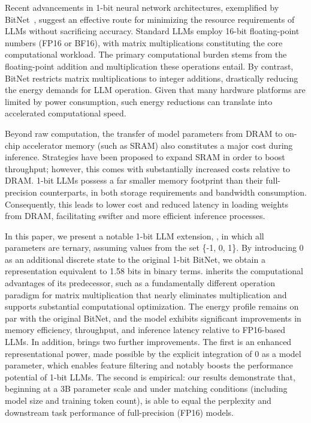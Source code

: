Recent advancements in 1-bit neural network architectures, exemplified by BitNet~\cite{bitnet}, suggest an effective route for minimizing the resource requirements of LLMs without sacrificing accuracy. Standard LLMs employ 16-bit floating-point numbers (FP16 or BF16), with matrix multiplications constituting the core computational workload. The primary computational burden stems from the floating-point addition and multiplication these operations entail. By contrast, BitNet restricts matrix multiplications to integer additions, drastically reducing the energy demands for LLM operation. Given that many hardware platforms are limited by power consumption, such energy reductions can translate into accelerated computational speed.

Beyond raw computation, the transfer of model parameters from DRAM to on-chip accelerator memory (such as SRAM) also constitutes a major cost during inference. Strategies have been proposed to expand SRAM in order to boost throughput; however, this comes with substantially increased costs relative to DRAM. 1-bit LLMs possess a far smaller memory footprint than their full-precision counterparts, in both storage requirements and bandwidth consumption. Consequently, this leads to lower cost and reduced latency in loading weights from DRAM, facilitating swifter and more efficient inference processes.

In this paper, we present a notable 1-bit LLM extension, \textbf{}, in which all parameters are ternary, assuming values from the set \{-1, 0, 1\}. By introducing 0 as an additional discrete state to the original 1-bit BitNet, we obtain a representation equivalent to 1.58 bits in binary terms.  inherits the computational advantages of its predecessor, such as a fundamentally different operation paradigm for matrix multiplication that nearly eliminates multiplication and supports substantial computational optimization. The energy profile remains on par with the original BitNet, and the model exhibits significant improvements in memory efficiency, throughput, and inference latency relative to FP16-based LLMs. In addition,  brings two further improvements. The first is an enhanced representational power, made possible by the explicit integration of 0 as a model parameter, which enables feature filtering and notably boosts the performance potential of 1-bit LLMs. The second is empirical: our results demonstrate that, beginning at a 3B parameter scale and under matching conditions (including model size and training token count),  is able to equal the perplexity and downstream task performance of full-precision (FP16) models.

